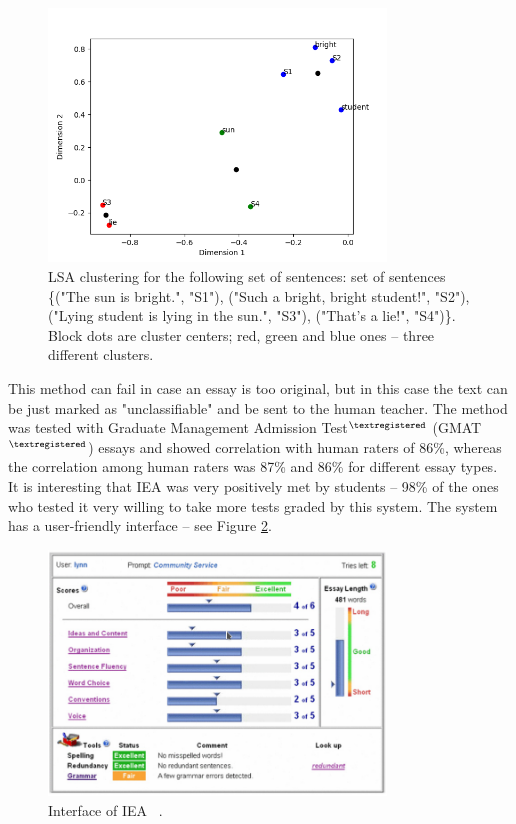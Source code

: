 \begin{itemize}
\begin{figure}[h!]
  \centering
  \includegraphics[width=0.8\textwidth]{img/LSAExample}
    \caption{LSA clustering for the following set of sentences: set of sentences \{("The sun is bright.", "S1"), ("Such a bright, bright student!", "S2"), ("Lying student is lying in the sun.", "S3"), ("That's a lie!", "S4")\}. Block dots are cluster centers; red, green and blue ones -- three different clusters. \label{fig:LSAExample}}
\end{figure}

\end{itemize}

This method can fail in case an essay is too original, but in this case the text can be just marked as "unclassifiable" and be sent to the human teacher. The method was tested with Graduate Management Admission Test$^{\tiny{\textregistered}}$ (GMAT$^{\tiny{\textregistered}}$) essays and showed correlation with human raters of 86\%, whereas the correlation among human raters was 87\% and 86\% for different essay types. It is interesting that IEA was very positively met by students -- 98\% of the ones who tested it very willing to take more tests graded by this system. The system has a user-friendly interface -- see Figure \ref{fig:IEAInt}. \\

\begin{figure}[h!]
  \centering
  \includegraphics[width=0.8\textwidth]{img/IEAInt}
    \caption{Interface of IEA ~\cite{aesOverview}.\label{fig:IEAInt}}
\end{figure}

